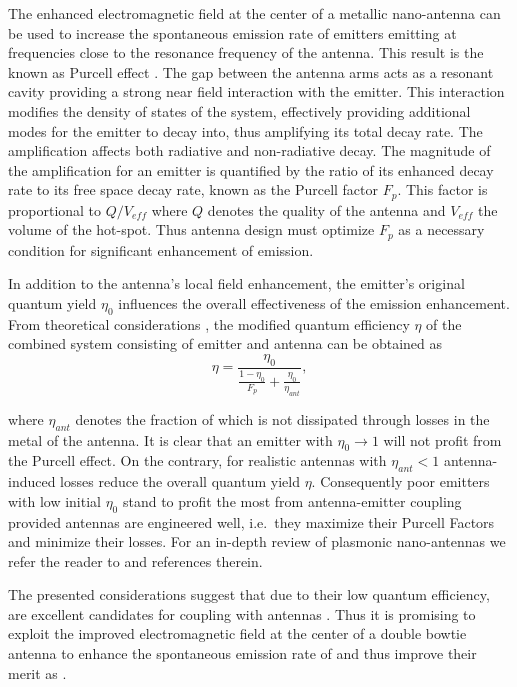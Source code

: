 		The enhanced electromagnetic field at the center of a metallic nano-antenna can be used to increase the spontaneous emission rate of emitters emitting at frequencies close to the resonance frequency of the antenna. This result is the known as Purcell effect \cite{purcell1995spontaneous}. The gap between the antenna arms acts as a resonant cavity providing a strong near field interaction with the emitter. This interaction modifies the density of states of the system, effectively providing additional modes for the emitter to decay into, thus amplifying its total decay rate. The amplification affects both radiative and non-radiative decay.
		The magnitude of the amplification for an emitter is quantified by the ratio of its enhanced decay rate to its free space decay rate, known as the Purcell factor $F_p$. This factor is proportional to $Q/V_{eff}$ where $Q$ denotes the quality of the antenna and $V_{eff}$ the volume of the hot-spot. Thus antenna design must optimize $F_p$ as a necessary condition for significant enhancement of \fl emission.
		
		In addition to the antenna's local field enhancement, the emitter's original quantum yield $\eta_0$ influences the overall effectiveness of the emission enhancement. From theoretical considerations \cite{rahbany2016towards, mohammadi2008gold, mohammadi2010fluorescence, wientjes2014nanoantenna}, the modified quantum efficiency $\eta$ of the combined system consisting of emitter and antenna can be obtained as
% 
		\begin{equation}
			\eta = \frac{\eta_0}{\frac{1-\eta_0}{F_p} + \frac{\eta_0}{\eta_{ant}} },
		\end{equation}

		where $\eta_{ant}$ denotes the fraction of \fl which is not dissipated through losses in the metal of the antenna. It is clear that an emitter with $\eta_0 \to 1$ will not profit from the Purcell effect. On the contrary, for realistic antennas with $\eta_{ant} < 1$ antenna-induced losses reduce the overall quantum yield $\eta$. Consequently poor emitters with low initial $\eta_{0}$ stand to profit the most from antenna-emitter coupling provided antennas are engineered well, i.e.\ they maximize their Purcell Factors and minimize their losses. For an in-depth review of plasmonic nano-antennas we refer the reader to \cite{rahbany2016towards} and references therein.
		
		The presented considerations suggest that due to their low quantum efficiency, \sivs are excellent candidates for coupling with antennas \cite{Neu2012a}. Thus it is promising to exploit the improved electromagnetic field at the center of a double bowtie antenna to enhance the spontaneous emission rate of \sivs and thus improve their merit as \spss.

